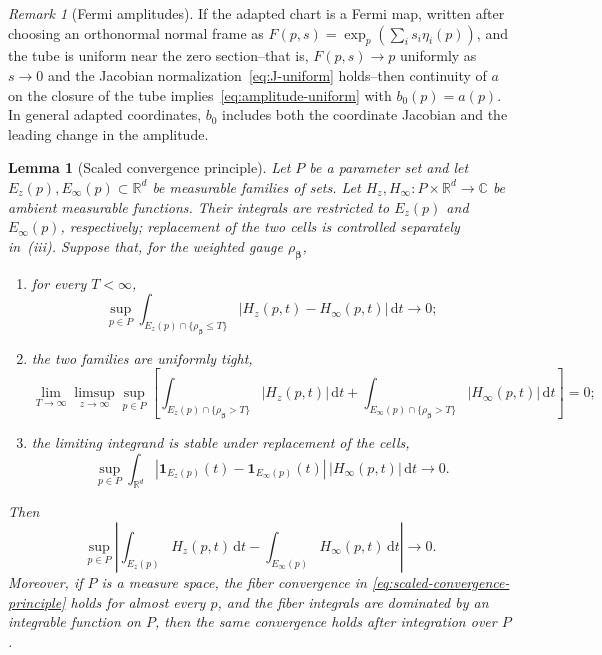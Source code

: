 \documentclass[11pt]{amsart}
\numberwithin{equation}{section}
\newtheorem{lemma}[theorem]{Lemma}
\theoremstyle{definition}
\theoremstyle{remark}
\newtheorem{remark}[theorem]{Remark}
\newcommand{\R}{\mathbb{R}}
\newcommand{\C}{\mathbb{C}}
\newcommand{\ind}{\mathbf{1}}
\newcommand{\dd}{\,\mathrm{d}}
\begin{document}
\begin{remark}[Fermi amplitudes]
If the adapted chart is a Fermi map, written after choosing an orthonormal
normal frame as $F(p,s)=\exp_p(\sum_i s_i\eta_i(p))$, and the tube is uniform
near the zero section--that is, $F(p,s)\to p$ uniformly as $s\to0$ and the
Jacobian normalization~\eqref{eq:J-uniform} holds--then continuity of $a$ on
the closure of the tube implies~\eqref{eq:amplitude-uniform} with
$b_0(p)=a(p)$.  In general adapted coordinates, $b_0$ includes both the
coordinate Jacobian and the leading change in the amplitude.
\end{remark}

\begin{lemma}[Scaled convergence principle]
\label{lem:scaled-integral-convergence}
Let $P$ be a parameter set and let $E_z(p),E_\infty(p)\subset\R^d$ be
measurable families of sets.  Let $H_z,H_\infty:P\times\R^d\to\C$ be
ambient measurable functions.  Their integrals are restricted to $E_z(p)$
and $E_\infty(p)$, respectively; replacement of the two cells is controlled
separately in~(iii).  Suppose that, for the weighted gauge
$\rho_{\bm\beta}$,
\begin{enumerate}[label=(\roman*),leftmargin=2.2em]
\item for every $T<\infty$,
\[
 \sup_{p\in P}\int_{E_z(p)\cap\{\rho_{\bm\beta}\le T\}}
 |H_z(p,t)-H_\infty(p,t)|\dd t\longrightarrow0;
\]
\item the two families are uniformly tight,
\[
 \lim_{T\to\infty}\limsup_{z\to\infty}\sup_{p\in P}
 \left[
 \int_{E_z(p)\cap\{\rho_{\bm\beta}>T\}}|H_z(p,t)|\dd t
 +\int_{E_\infty(p)\cap\{\rho_{\bm\beta}>T\}}|H_\infty(p,t)|\dd t
 \right]=0;
\]
\item the limiting integrand is stable under replacement of the cells,
\[
 \sup_{p\in P}\int_{\R^d}
 |\ind_{E_z(p)}(t)-\ind_{E_\infty(p)}(t)|\,
 |H_\infty(p,t)|\dd t\longrightarrow0.
\]
\end{enumerate}
Then
\begin{equation}\label{eq:scaled-convergence-principle}
 \sup_{p\in P}\left|
 \int_{E_z(p)}H_z(p,t)\dd t
 -\int_{E_\infty(p)}H_\infty(p,t)\dd t
 \right|\longrightarrow0.
\end{equation}
Moreover, if $P$ is a measure space, the fiber convergence in
\eqref{eq:scaled-convergence-principle} holds for almost every $p$, and the
fiber integrals are dominated by an integrable function on $P$, then the same convergence
holds after integration over $P$.
\end{lemma}
\end{document}
